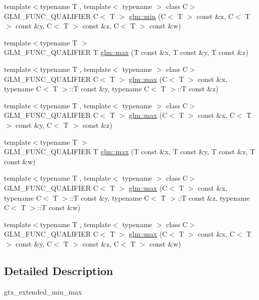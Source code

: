 \begin{DoxyCompactItemize}
{\footnotesize template$<$typename T , template$<$ typename $>$ class C$>$ }\\G\+L\+M\+\_\+\+F\+U\+N\+C\+\_\+\+Q\+U\+A\+L\+I\+F\+I\+ER C$<$ T $>$ \hyperlink{group__gtx__extented__min__max_ga7471ea4159eed8dd9ea4ac5d46c2fead}{glm\+::min} (C$<$ T $>$ const \&x, C$<$ T $>$ const \&y, C$<$ T $>$ const \&z, C$<$ T $>$ const \&w)
\item 
{\footnotesize template$<$typename T $>$ }\\G\+L\+M\+\_\+\+F\+U\+N\+C\+\_\+\+Q\+U\+A\+L\+I\+F\+I\+ER T \hyperlink{group__gtx__extented__min__max_ga04991ccb9865c4c4e58488cfb209ce69}{glm\+::max} (T const \&x, T const \&y, T const \&z)
\item 
{\footnotesize template$<$typename T , template$<$ typename $>$ class C$>$ }\\G\+L\+M\+\_\+\+F\+U\+N\+C\+\_\+\+Q\+U\+A\+L\+I\+F\+I\+ER C$<$ T $>$ \hyperlink{group__gtx__extented__min__max_gae1b7bbe5c91de4924835ea3e14530744}{glm\+::max} (C$<$ T $>$ const \&x, typename C$<$ T $>$\+::T const \&y, typename C$<$ T $>$\+::T const \&z)
\item 
{\footnotesize template$<$typename T , template$<$ typename $>$ class C$>$ }\\G\+L\+M\+\_\+\+F\+U\+N\+C\+\_\+\+Q\+U\+A\+L\+I\+F\+I\+ER C$<$ T $>$ \hyperlink{group__gtx__extented__min__max_gaf832e9d4ab4826b2dda2fda25935a3a4}{glm\+::max} (C$<$ T $>$ const \&x, C$<$ T $>$ const \&y, C$<$ T $>$ const \&z)
\item 
{\footnotesize template$<$typename T $>$ }\\G\+L\+M\+\_\+\+F\+U\+N\+C\+\_\+\+Q\+U\+A\+L\+I\+F\+I\+ER T \hyperlink{group__gtx__extented__min__max_ga78e04a0cef1c4863fcae1a2130500d87}{glm\+::max} (T const \&x, T const \&y, T const \&z, T const \&w)
\item 
{\footnotesize template$<$typename T , template$<$ typename $>$ class C$>$ }\\G\+L\+M\+\_\+\+F\+U\+N\+C\+\_\+\+Q\+U\+A\+L\+I\+F\+I\+ER C$<$ T $>$ \hyperlink{group__gtx__extented__min__max_ga7cca8b53cfda402040494cdf40fbdf4a}{glm\+::max} (C$<$ T $>$ const \&x, typename C$<$ T $>$\+::T const \&y, typename C$<$ T $>$\+::T const \&z, typename C$<$ T $>$\+::T const \&w)
\item 
{\footnotesize template$<$typename T , template$<$ typename $>$ class C$>$ }\\G\+L\+M\+\_\+\+F\+U\+N\+C\+\_\+\+Q\+U\+A\+L\+I\+F\+I\+ER C$<$ T $>$ \hyperlink{group__gtx__extented__min__max_gaacffbc466c2d08c140b181e7fd8a4858}{glm\+::max} (C$<$ T $>$ const \&x, C$<$ T $>$ const \&y, C$<$ T $>$ const \&z, C$<$ T $>$ const \&w)
\end{DoxyCompactItemize}


\subsection{Detailed Description}
gtx\+\_\+extended\+\_\+min\+\_\+max 